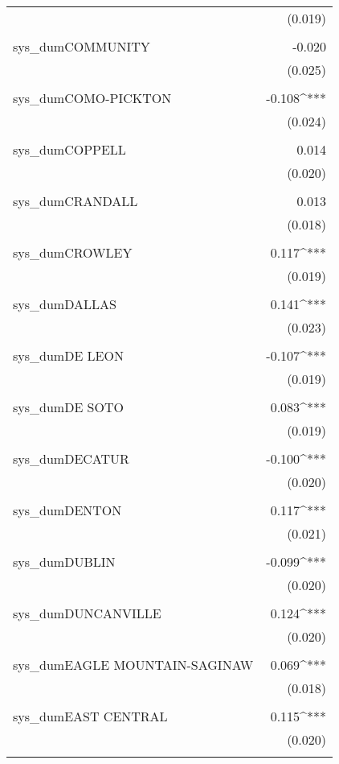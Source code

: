 \begin{table}[!htbp]
\begin{tabular}{@{\extracolsep{5pt}}lD{.}{.}{-3} }
  & (0.019) \\ 
  & \\ 
 sys\_dumCOMMUNITY & -0.020 \\ 
  & (0.025) \\ 
  & \\ 
 sys\_dumCOMO-PICKTON & -0.108^{***} \\ 
  & (0.024) \\ 
  & \\ 
 sys\_dumCOPPELL & 0.014 \\ 
  & (0.020) \\ 
  & \\ 
 sys\_dumCRANDALL & 0.013 \\ 
  & (0.018) \\ 
  & \\ 
 sys\_dumCROWLEY & 0.117^{***} \\ 
  & (0.019) \\ 
  & \\ 
 sys\_dumDALLAS & 0.141^{***} \\ 
  & (0.023) \\ 
  & \\ 
 sys\_dumDE LEON & -0.107^{***} \\ 
  & (0.019) \\ 
  & \\ 
 sys\_dumDE SOTO & 0.083^{***} \\ 
  & (0.019) \\ 
  & \\ 
 sys\_dumDECATUR & -0.100^{***} \\ 
  & (0.020) \\ 
  & \\ 
 sys\_dumDENTON & 0.117^{***} \\ 
  & (0.021) \\ 
  & \\ 
 sys\_dumDUBLIN & -0.099^{***} \\ 
  & (0.020) \\ 
  & \\ 
 sys\_dumDUNCANVILLE & 0.124^{***} \\ 
  & (0.020) \\ 
  & \\ 
 sys\_dumEAGLE MOUNTAIN-SAGINAW & 0.069^{***} \\ 
  & (0.018) \\ 
  & \\ 
 sys\_dumEAST CENTRAL & 0.115^{***} \\ 
  & (0.020) \\ 
  & \\ 

\end{tabular}
\end{table}
